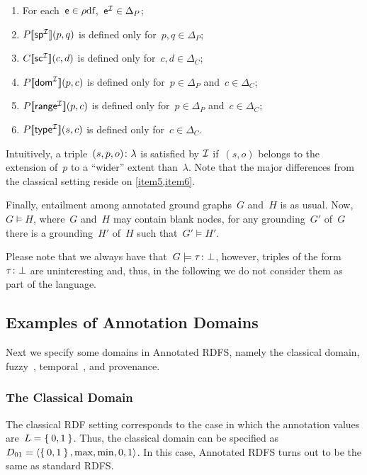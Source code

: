 \begin{definition}
\begin{description}
    \begin{enumerate}
    \item For each~$\mathsf{e} \in \mbox{$\rho$df}$,~${\mathsf{e}}^{\mathcal{I}} \in \Delta_{P}$; 
    \item ${P[\![{\mathsf{sp}}^{\mathcal{I}}]\!]}(p, q)$ is defined only for~$p,q \in \Delta_{P}$;
    \item ${C[\![{\mathsf{sc}}^{\mathcal{I}}]\!]}(c, d)$ is defined only for~$c,d \in \Delta_{C}$;
    \item ${P[\![{\mathsf{dom}}^{\mathcal{I}}]\!]}(p, c)$ is defined only for~$p \in \Delta_{P}$ and~$c \in \Delta_{C}$;
    \item  ${P[\![{\mathsf{range}}^{\mathcal{I}}]\!]}(p, c)$ is defined only for~$p \in \Delta_{P}$ and~$c \in \Delta_{C}$;
    \item ${P[\![{\mathsf{type}}^{\mathcal{I}}]\!]}(s, c)$ is defined only for~$c \in \Delta_{C}$.
    \end{enumerate}
  \end{description}
\end{definition}
%
\nd Intuitively, a triple~$\mbox{$(s, p, o)\colon\lambda$}$ is satisfied by $\mathcal{I}$ if~$(s, o)$ belongs to the extension
of~$p$ to a ``wider'' extent than~$\lambda$.
%
Note that the major differences from the classical setting reside on \cref{item5,item6}.


Finally, entailment among annotated ground graphs~$G$ and~$H$ is as usual.
Now,~$G \models H$, where~$G$ and~$H$ may contain blank nodes, \iff for any grounding~$G'$ of~$G$ there is a grounding~$H'$ of~$H$ such that~$G' \models H'$.

Please note that we always have that~$G \models \mbox{$\tau\colon\bot$}$, however, triples of the form~$\mbox{$\tau\colon\bot$}$
are uninteresting and, thus, in the following we do not consider them as part of the language.


\subsection{Examples of Annotation Domains}
\label{sec:domain-examples}


Next we specify some domains in Annotated RDFS, namely the classical domain, fuzzy~\cite{Straccia:2009aa},
temporal~\cite{GutierrezHurtadoVaisman:2007aa}, and provenance.

\subsubsection{The Classical Domain}
\label{sec:crisp}

The classical \ac{RDF} setting corresponds to the case in which the annotation values are~$L = \left\{\:0,1\:\right\}$.
%
Thus, the classical domain can be specified as~$D_{01} = \langle \left\{\:0, 1\:\right\}, \max, \min, 0, 1 \rangle$.  In this case, Annotated
RDFS turns out to be the same as standard \ac{RDFS}.


